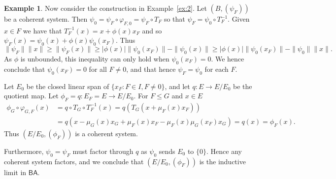 \documentclass[a4paper,11pt]{article}
\newcommand{\ba}{\textsf{BA}}
\theoremstyle{definition}
\newtheorem{example}[lemma]{Example}
\begin{document}
\begin{example}
Now consider the construction in Example~\ref{ex:2}.  Let $(B,(\psi_F))$ be a coherent system.
Then $\psi_0 = \psi_F \circ \varphi_{F,0} = \psi_F \circ T_F$ so that $\psi_F = \psi_0 \circ
T_F^{-1}$.  Given $x\in F$ we have that $T_F^{-1}(x) = x + \phi(x)x_F$ and so $\psi_F(x)
= \psi_0(x) + \phi(x) \psi_0(x_F)$.  Thus
\[ \|\psi_F\| \|x\| \geq \|\psi_F(x)\| \geq |\phi(x)|\|\psi_0(x_F)\| - \|\psi_0(x)\|
\geq |\phi(x)|\|\psi_0(x_F)\| - \|\psi_0\| \|x\|. \]
As $\phi$ is unbounded, this inequality can only hold when $\psi_0(x_F)=0$.
We hence conclude that $\psi_0(x_F)=0$ for all $F\not=0$, and that hence $\psi_F = \psi_0$ for
each $F$.

Let $E_0$ be the closed linear span of $\{ x_F : F\in I, F\not=0 \}$, and let $q:E\rightarrow E/E_0$
be the quotient map.  Let $\phi_F = q: E_F=E \rightarrow E/E_0$.  For $F\leq G$ and $x\in E$
\begin{align*}
\phi_G \circ \varphi_{G,F}(x) &= q \circ T_G \circ T_F^{-1}(x)
= q(T_G(x + \mu_F(x) x_F)) \\
&= q( x - \mu_G(x)x_G + \mu_F(x) x_F - \mu_F(x)\mu_G(x_F) x_G)
= q(x) = \phi_F(x).
\end{align*}
Thus $(E/E_0,(\phi_F))$ is a coherent system.

Furthermore, $\psi_0 = \psi_F$ must factor through $q$ as $\psi_0$ sends $E_0$ to $\{0\}$.
Hence any coherent system factors, and we conclude that $(E/E_0,(\phi_F))$ is the inductive limit
in $\ba$.
\end{example}
\end{document}
